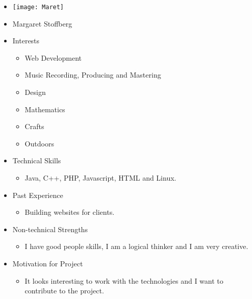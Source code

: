 
\begin{itemize}
	\item[] \texttt{[image: Maret]}
	\item[] Margaret Stoffberg
	\item Interests
	\begin{itemize}
		\item Web Development
		\item Music Recording, Producing and Mastering
		\item Design
		\item Mathematics
		\item Crafts
		\item Outdoors
	\end{itemize}
	\item Technical Skills
	\begin{itemize}
		\item[] Java, C++, PHP, Javascript, HTML and Linux.
	\end{itemize}
	\item Past Experience
	\begin{itemize}
		\item[] Building websites for clients.
	\end{itemize}
	\item Non-technical Strengths
	\begin{itemize}
		\item[] I have good people skills, I am a logical thinker and I am very creative.
	\end{itemize}
	\item Motivation for Project
	\begin{itemize}
		\item[] It looks interesting to work with the technologies and I want to contribute to the project.
	\end{itemize}
\end{itemize}
